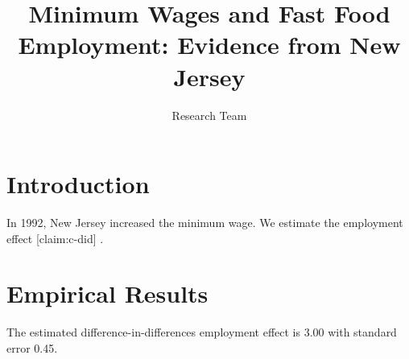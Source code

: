 \documentclass{article}
\newcommand{\result}[2]{#2}
\begin{document}
\title{Minimum Wages and Fast Food Employment: Evidence from New Jersey}
\author{Research Team}
\maketitle
\section{Introduction}
In 1992, New Jersey increased the minimum wage. We estimate the employment effect [claim:c-did] \cite{card1994}.
\section{Empirical Results}
The estimated difference-in-differences employment effect is \result{primary.estimate}{3.00}
with standard error \result{primary.std_error}{0.45}.
\par\medskip\noindent


\end{document}

